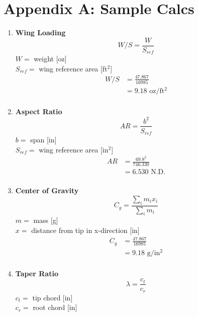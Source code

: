 \section*{Appendix A: Sample Calcs}

\begin{enumerate}[wide,label=\textbf{\arabic*}., labelindent=0pt]

    \item \textbf{Wing Loading}
        \[W/S = \frac{W}{S_{ref}}\]
        $ W =$ weight [oz]\\
        $S_{ref} =$ wing reference area [ft$^2$]\\
        
        \begin{align*}
            W/S &= \frac{47.867}{16985}\\
            &= 9.18 \text{ oz/ft$^2$}\\
        \end{align*}
        
        \item \textbf{Aspect Ratio}
        \[AR = \frac{b^2}{S_{ref}}\]
        $ b =$ span [in]\\
        $S_{ref} =$ wing reference area [in$^2$]\\
        
        \begin{align*}
            AR &= \frac{69.8^2}{746.330}\\
            &= 6.530 \text{ N.D.}\\
        \end{align*}
    
    \item \textbf{Center of Gravity}
        \[C_g = \frac{\sum_i m_i x_i }{\sum_i m_i}\]
        $ m =$ mass [g]\\
        $ x =$ distance from tip in x-direction [in]\\
        
        \begin{align*}
            C_g &= \frac{47.867}{16985}\\
            &= 9.18 \text{ g/in$^2$}\\
        \end{align*}
        
    \item \textbf{Taper Ratio}
        \[\lambda = \frac{c_t}{c_r}\]
        $ c_t =$ tip chord [in]\\
        $ c_r =$ root chord [in]\\
        

\end{enumerate}
